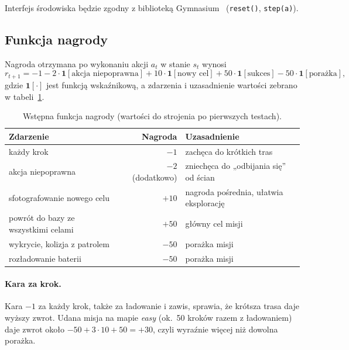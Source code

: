 Interfejs środowiska będzie zgodny z biblioteką Gymnasium~\cite{gymnasium}
(\texttt{reset()}, \texttt{step(a)}).

\subsection{Funkcja nagrody}
\label{sec:nagroda}

Nagroda otrzymana po wykonaniu akcji $a_t$ w stanie $s_t$ wynosi
\begin{equation}
  r_{t+1} = -1
    - 2 \cdot \mathbf{1}[\text{akcja niepoprawna}]
    + 10 \cdot \mathbf{1}[\text{nowy cel}]
    + 50 \cdot \mathbf{1}[\text{sukces}]
    - 50 \cdot \mathbf{1}[\text{porażka}],
\end{equation}
gdzie $\mathbf{1}[\cdot]$ jest funkcją wskaźnikową, a zdarzenia
i uzasadnienie wartości zebrano w tabeli~\ref{tab:reward}.

\begin{table}[h]
\centering
\begin{tabularx}{\textwidth}{>{\raggedright}p{} r >{\raggedright\arraybackslash}X}
  \toprule
  Zdarzenie & Nagroda & Uzasadnienie \\
  \midrule
  każdy krok & $-1$ & zachęca do krótkich tras \\
  akcja niepoprawna & $-2$ (dodatkowo) & zniechęca do „odbijania się'' od ścian \\
  sfotografowanie nowego celu & $+10$ & nagroda pośrednia, ułatwia eksplorację \\
  powrót do bazy ze wszystkimi celami & $+50$ & główny cel misji \\
  wykrycie, kolizja z patrolem & $-50$ & porażka misji \\
  rozładowanie baterii & $-50$ & porażka misji \\
  \bottomrule
\end{tabularx}
\caption{Wstępna funkcja nagrody (wartości do strojenia po pierwszych testach).}
\label{tab:reward}
\end{table}

\paragraph{Kara za krok.} Kara $-1$ za każdy krok, także za ładowanie
i zawis, sprawia, że krótsza trasa daje wyższy zwrot. Udana misja na mapie
\emph{easy} (ok.~50 kroków razem z ładowaniem) daje zwrot około
$-50 + 3 \cdot 10 + 50 = +30$, czyli wyraźnie więcej niż dowolna porażka.

